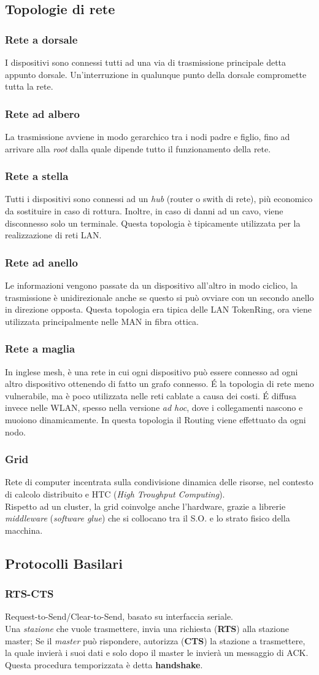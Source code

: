 \documentclass[a4paper,11pt]{article}
\def\subsub#1{\subsubsection{#1}\label{#1}}
\def\italic#1{\textit{#1}}
\begin{document}
\subsection{Topologie di rete}
\subsub{Rete a dorsale}
I dispositivi sono connessi tutti ad una via di trasmissione principale detta appunto dorsale. Un'interruzione in qualunque punto della dorsale compromette tutta la rete.
\subsub{Rete ad albero} La trasmissione avviene in modo gerarchico tra i nodi padre e figlio, fino ad arrivare alla \textit{root} dalla quale dipende tutto il funzionamento della rete.
\subsub{Rete a stella} Tutti i dispositivi sono connessi ad un \italic{hub} (router o swith di rete), più economico da sostituire in caso di rottura. Inoltre, in caso di danni ad un cavo, viene disconnesso solo un terminale. Questa topologia è tipicamente utilizzata per la realizzazione di reti LAN.
\subsub{Rete ad anello} Le informazioni vengono passate da un dispositivo all'altro in modo ciclico, la trasmissione è unidirezionale anche se questo si può ovviare con un secondo anello in direzione opposta. Questa topologia era tipica delle LAN TokenRing, ora viene utilizzata principalmente nelle MAN in fibra ottica.
\subsub{Rete a maglia} In inglese mesh, è una rete in cui ogni dispositivo può essere connesso ad ogni altro dispositivo ottenendo di fatto un grafo connesso. \'E la topologia di rete meno vulnerabile, ma è poco utilizzata nelle reti cablate a causa dei costi. \'E diffusa invece nelle WLAN, spesso nella versione \textit{ad hoc}, dove i collegamenti nascono e muoiono dinamicamente. In questa topologia il Routing viene effettuato da ogni nodo.
\subsub{Grid}
Rete di computer incentrata sulla condivisione dinamica delle risorse, nel contesto di calcolo distribuito e HTC (\textit{High Troughput Computing}).\\ Rispetto ad un cluster, la grid coinvolge anche l'hardware, grazie a librerie \textit{middleware} (\textit{software glue}) che si collocano tra il S.O. e lo strato fisico della macchina.%
\newpage
\subsection{Protocolli Basilari}
\subsubsection{RTS-CTS}
Request-to-Send/Clear-to-Send, basato su interfaccia seriale.\\
Una \textit{stazione} che vuole trasmettere, invia una richiesta (\textbf{RTS}) alla stazione master; Se il \textit{master} può rispondere, autorizza (\textbf{CTS}) la stazione a trasmettere, la quale invierà i suoi dati e solo dopo il master le invierà un messaggio di ACK.\\
Questa procedura temporizzata è detta \textbf{handshake}.
\end{document}
